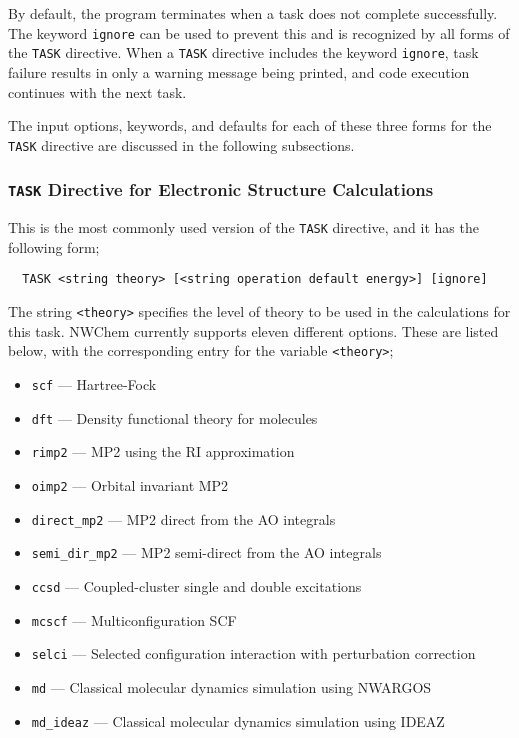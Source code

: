 By default, the program terminates when a task does not complete
successfully.  The keyword \verb+ignore+ can be used to prevent this
and is recognized by all forms of the \verb+TASK+ directive.  When a
\verb+TASK+ directive includes the keyword \verb+ignore+, task failure
results in only a warning message being printed, and code execution
continues with the next task.

The input options, keywords, and defaults for each of
these three forms for the \verb+TASK+ directive are discussed in the
following subsections.

\subsubsection{{\tt TASK} Directive for Electronic Structure Calculations}

This is the most commonly used version of the \verb+TASK+ directive, and
it has the following form;

\begin{verbatim}
  TASK <string theory> [<string operation default energy>] [ignore]
\end{verbatim}

The string \verb+<theory>+ specifies the level of theory to be used in the
calculations for this task.  NWChem currently supports eleven different
options.  These are listed below, with the corresponding entry for 
the variable {\tt <theory>};
\begin{itemize}
 \item \verb+scf+ --- Hartree-Fock
 \item \verb+dft+ --- Density functional theory for molecules
 \item \verb+rimp2+ --- MP2 using the RI approximation
 \item \verb+oimp2+ --- Orbital invariant MP2
 \item \verb+direct_mp2+ --- MP2 direct from the AO integrals
 \item \verb+semi_dir_mp2+ --- MP2 semi-direct from the AO integrals
 \item \verb+ccsd+ --- Coupled-cluster single and double excitations
 \item \verb+mcscf+ --- Multiconfiguration SCF
 \item \verb+selci+ --- Selected configuration interaction with perturbation
   correction 
 \item \verb+md+ --- Classical molecular dynamics simulation using NWARGOS
 \item \verb+md_ideaz+ --- Classical molecular dynamics simulation
   using IDEAZ
\end{itemize}


